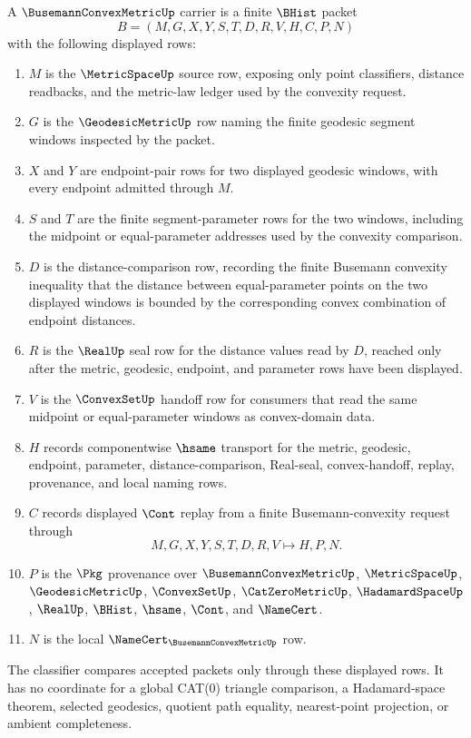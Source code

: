 \begin{definition}
\label{def:busemann-convex-metric-carrier}
A $\BusemannConvexMetricUp$ carrier is a finite $\BHist$ packet
$$
B=(M,G,X,Y,S,T,D,R,V,H,C,P,N)
$$
with the following displayed rows:
\begin{enumerate}
\item $M$ is the $\MetricSpaceUp$ source row, exposing only point classifiers, distance readbacks, and the metric-law ledger used by the convexity request.
\item $G$ is the $\GeodesicMetricUp$ row naming the finite geodesic segment windows inspected by the packet.
\item $X$ and $Y$ are endpoint-pair rows for two displayed geodesic windows, with every endpoint admitted through $M$.
\item $S$ and $T$ are the finite segment-parameter rows for the two windows, including the midpoint or equal-parameter addresses used by the convexity comparison.
\item $D$ is the distance-comparison row, recording the finite Busemann convexity inequality that the distance between equal-parameter points on the two displayed windows is bounded by the corresponding convex combination of endpoint distances.
\item $R$ is the $\RealUp$ seal row for the distance values read by $D$, reached only after the metric, geodesic, endpoint, and parameter rows have been displayed.
\item $V$ is the $\ConvexSetUp$ handoff row for consumers that read the same midpoint or equal-parameter windows as convex-domain data.
\item $H$ records componentwise $\hsame$ transport for the metric, geodesic, endpoint, parameter, distance-comparison, Real-seal, convex-handoff, replay, provenance, and local naming rows.
\item $C$ records displayed $\Cont$ replay from a finite Busemann-convexity request through
$$
M,G,X,Y,S,T,D,R,V \longmapsto H,P,N .
$$
\item $P$ is the $\Pkg$ provenance over $\BusemannConvexMetricUp$, $\MetricSpaceUp$, $\GeodesicMetricUp$, $\ConvexSetUp$, $\CatZeroMetricUp$, $\HadamardSpaceUp$, $\RealUp$, $\BHist$, $\hsame$, $\Cont$, and $\NameCert$.
\item $N$ is the local $\NameCert_{\BusemannConvexMetricUp}$ row.
\end{enumerate}
The classifier compares accepted packets only through these displayed rows. It has no coordinate for a global CAT(0) triangle comparison, a Hadamard-space theorem, selected geodesics, quotient path equality, nearest-point projection, or ambient completeness.
\end{definition}

